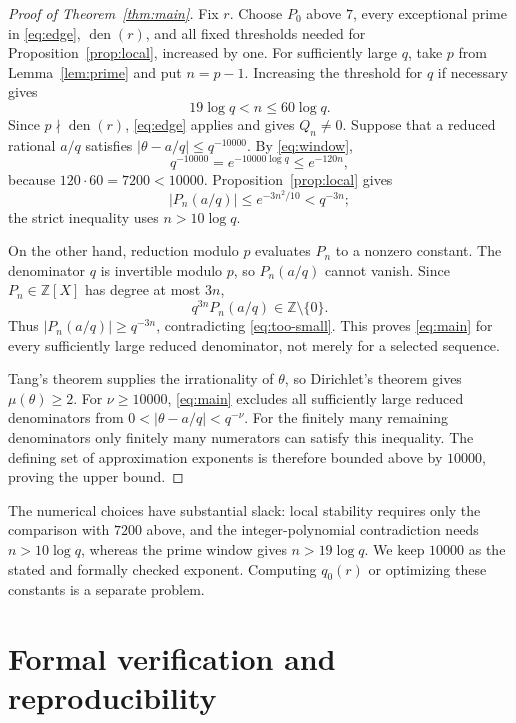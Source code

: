 \documentclass[11pt]{article}
\numberwithin{equation}{section}
\newcommand{\Z}{\mathbb Z}
\begin{document}
\begin{proof}[Proof of Theorem~\ref{thm:main}]
Fix $r$. Choose $P_0$ above $7$, every exceptional prime in
\eqref{eq:edge}, $\operatorname{den}(r)$, and all fixed thresholds
needed for Proposition~\ref{prop:local}, increased by one.
For sufficiently large $q$, take $p$ from Lemma~\ref{lem:prime} and
put $n=p-1$. Increasing the threshold for $q$ if necessary gives
\begin{equation}\label{eq:window}
                         19\log q<n\leq60\log q.
\end{equation}
Since $p\nmid\operatorname{den}(r)$, \eqref{eq:edge} applies and gives
$Q_n\ne0$. Suppose that a reduced rational $a/q$ satisfies
$|\theta-a/q|\leq q^{-10000}$. By \eqref{eq:window},
\[
 q^{-10000}=e^{-10000\log q}\leq e^{-120n},
\]
because $120\cdot60=7200<10000$. Proposition~\ref{prop:local} gives
\begin{equation}\label{eq:too-small}
                    |P_n(a/q)|\leq e^{-3n^2/10}<q^{-3n};
\end{equation}
the strict inequality uses $n>10\log q$.

On the other hand, reduction modulo $p$ evaluates $P_n$ to a nonzero
constant. The denominator $q$ is invertible modulo $p$, so $P_n(a/q)$
cannot vanish. Since $P_n\in\Z[X]$ has degree at most $3n$,
\[
                          q^{3n}P_n(a/q)\in\Z\setminus\{0\}.
\]
Thus $|P_n(a/q)|\geq q^{-3n}$, contradicting \eqref{eq:too-small}.
This proves \eqref{eq:main} for every sufficiently large reduced
denominator, not merely for a selected sequence.

Tang's theorem supplies the irrationality of $\theta$, so Dirichlet's
theorem gives $\mu(\theta)\geq2$. For $\nu\geq10000$,
\eqref{eq:main} excludes all sufficiently large reduced denominators
from $0<|\theta-a/q|<q^{-\nu}$. For the finitely many remaining
denominators only finitely many numerators can satisfy this inequality.
The defining set of approximation exponents is therefore bounded above
by $10000$, proving the upper bound.
\end{proof}

The numerical choices have substantial slack: local stability requires
only the comparison with $7200$ above, and the integer-polynomial
contradiction needs $n>10\log q$, whereas the prime window gives
$n>19\log q$. We keep $10000$ as the stated and formally checked
exponent. Computing $q_0(r)$ or optimizing these constants is a separate
problem.

\section{Formal verification and reproducibility}\label{sec:formal}
\end{document}
